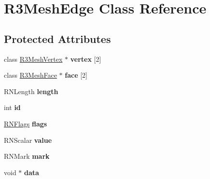 \hypertarget{class_r3_mesh_edge}{}\section{R3\+Mesh\+Edge Class Reference}
\label{class_r3_mesh_edge}
\subsection*{Protected Attributes}
\begin{DoxyCompactItemize}
\item 
class \hyperlink{class_r3_mesh_vertex}{R3\+Mesh\+Vertex} $\ast$ {\bfseries vertex} \mbox{[}2\mbox{]}\hypertarget{class_r3_mesh_edge_aa8675d7fdfeed2f6ea93236dc6000c9c}{}\label{class_r3_mesh_edge_aa8675d7fdfeed2f6ea93236dc6000c9c}

\item 
class \hyperlink{class_r3_mesh_face}{R3\+Mesh\+Face} $\ast$ {\bfseries face} \mbox{[}2\mbox{]}\hypertarget{class_r3_mesh_edge_a4ad489bd6544385961c932a232659b96}{}\label{class_r3_mesh_edge_a4ad489bd6544385961c932a232659b96}

\item 
R\+N\+Length {\bfseries length}\hypertarget{class_r3_mesh_edge_a04cc5e5d38cd6b5c3f8e6b9f08c70e76}{}\label{class_r3_mesh_edge_a04cc5e5d38cd6b5c3f8e6b9f08c70e76}

\item 
int {\bfseries id}\hypertarget{class_r3_mesh_edge_a6bf09c1a2dea115c4b293524a08f4a96}{}\label{class_r3_mesh_edge_a6bf09c1a2dea115c4b293524a08f4a96}

\item 
\hyperlink{class_r_n_flags}{R\+N\+Flags} {\bfseries flags}\hypertarget{class_r3_mesh_edge_a97bc7b8735fa37d84c993d0bbf221b94}{}\label{class_r3_mesh_edge_a97bc7b8735fa37d84c993d0bbf221b94}

\item 
R\+N\+Scalar {\bfseries value}\hypertarget{class_r3_mesh_edge_af36776dbdc853c3497e6261230f40fe0}{}\label{class_r3_mesh_edge_af36776dbdc853c3497e6261230f40fe0}

\item 
R\+N\+Mark {\bfseries mark}\hypertarget{class_r3_mesh_edge_a2e30502c65e5b5929dd7b2b8965c31ba}{}\label{class_r3_mesh_edge_a2e30502c65e5b5929dd7b2b8965c31ba}

\item 
void $\ast$ {\bfseries data}\hypertarget{class_r3_mesh_edge_ade4a16e541780fbe054ba5c79a525c2e}{}\label{class_r3_mesh_edge_ade4a16e541780fbe054ba5c79a525c2e}

\end{DoxyCompactItemize}
